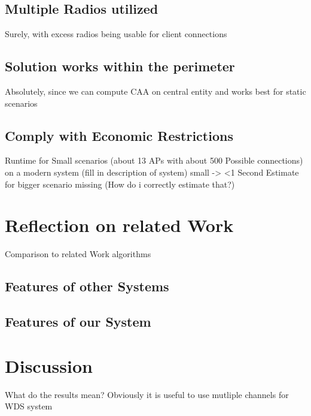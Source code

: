   \subsection{Multiple Radios utilized}
    Surely, with excess radios being usable for client connections \newline
  \subsection{Solution works within the perimeter}
    Absolutely, since we can compute CAA on central entity and works best for static scenarios \newline
  \subsection{Comply with Economic Restrictions}
    Runtime for Small scenarios (about 13 APs with about 500 Possible connections) on a modern system (fill in description of system) small -> <1 Second
    Estimate for bigger scenario missing (How do i correctly estimate that?)
\section{Reflection on related Work}
  Comparison to related Work algorithms\newline
  \subsection{Features of other Systems}
  \subsection{Features of our System}
    
\section{Discussion}
  What do the results mean? \newline
    Obviously it is useful to use mutliple channels for WDS system \newline
